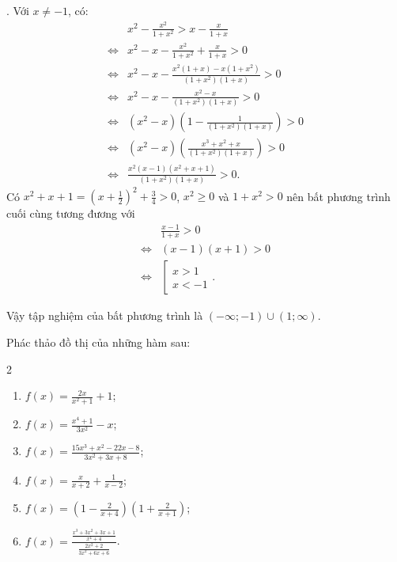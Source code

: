 . Với $x \neq -1$, có:
\begin{align*}
   &x^2 - \frac{x^2}{1+x^2} > x - \frac{x}{1+x}\\
   \iff &x^2 - x - \frac{x^2}{1+x^2} + \frac{x}{1+x} > 0 \\
   \iff &x^2 - x - \frac{x^2(1 + x) - x\left(1+x^2\right)}{\left(1+x^2\right)(1 + x)} > 0 \\
   \iff &x^2 - x - \frac{x^2 - x}{\left(1 + x^2\right)(1 + x)} > 0 \\
   \iff &\left(x^2 - x\right)\left(1 - \frac{1}{\left(1+x^2\right)(1 + x)}\right) > 0 \\
   \iff &\left(x^2 - x\right)\left(\frac{x^3 + x^2 + x}{(1 + x^2)(1 + x)}\right) > 0 \\
   \iff &\frac{x^2(x - 1)(x^2 + x + 1)}{(1 + x^2)(1 + x)} > 0.
\end{align*}
Có $x^2 + x + 1 = \left(x + \frac 12\right)^2 + \frac 34 > 0$, $x^2 \geq 0$ và $1 + x^2 > 0$ nên bất phương trình cuối cùng tương đương với
\begin{align*}
   &\frac{x - 1}{1 + x} > 0 \\
   \iff &(x - 1)(x + 1) > 0 \\
   \iff &\left[\begin{array}{c}
      x > 1 \\
      x < -1
   \end{array}\right..
\end{align*}

Vậy tập nghiệm của bất phương trình là $\left(-\infty; -1\right) \cup \left(1; \infty\right)$.

\exercise Phác thảo đồ thị của những hàm sau:

\begin{multicols}{2}
   \begin{enumerate}
      \item $\displaystyle f(x) = \frac{2x}{x^2 + 1} + 1$;
      \item $\displaystyle f(x) = \frac{x^4 + 1}{3x^2} - x$;
      \item $\displaystyle f(x) = \frac{15x^3 + x^2 - 22x - 8}{3x^2 + 3x + 8}$;
      \item $\displaystyle f(x) = \frac{x}{x + 2} + \frac{1}{x - 2}$;
      \item $\displaystyle f(x) = \left(1 - \frac{2}{x + 4}\right) \left(1 + \frac{2}{x + 1}\right)$;
      \item $\displaystyle f(x) = \frac{\frac{x^3 + 3x^2 + 3x + 1}{x^4 + 4}}{\frac{2x^2 + 2}{3x^2 + 6x + 6}}$.
   \end{enumerate}
\end{multicols}

